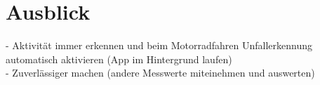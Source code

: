\chapter{Ausblick}
- Aktivität immer erkennen und beim Motorradfahren Unfallerkennung automatisch aktivieren (App im Hintergrund laufen)\\

- Zuverlässiger machen (andere Messwerte miteinehmen und auswerten)
